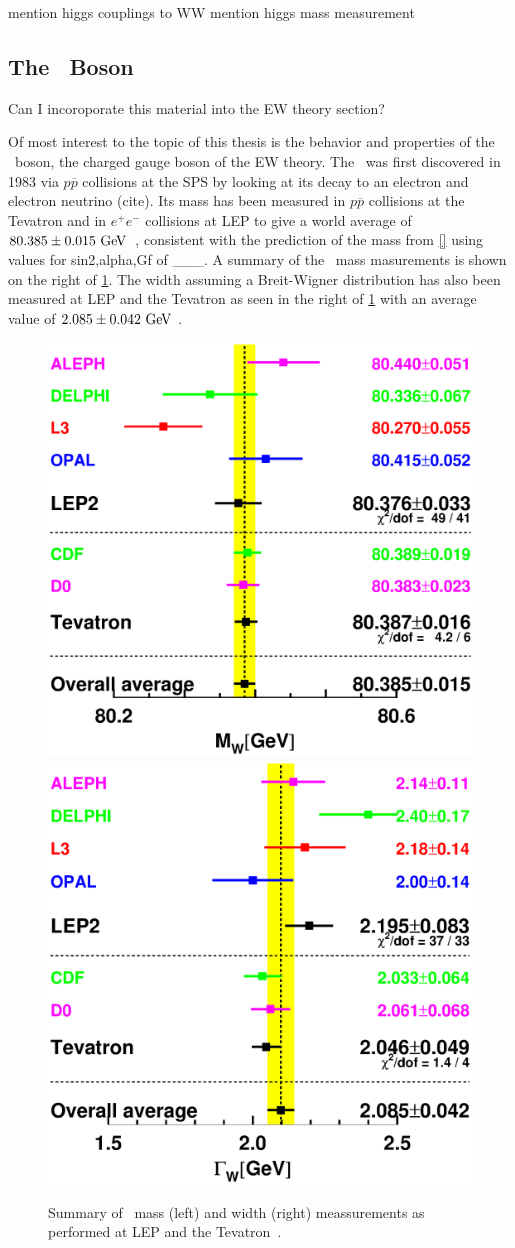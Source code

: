 mention higgs couplings to WW
mention higgs mass measurement



\subsection{The \dubya~Boson}

Can I incoroporate this material into the EW theory section?


Of most interest to the topic of this thesis is the behavior and properties
of the \dubya~boson, the charged gauge boson of the EW theory.
The \dubya~was first discovered in 1983 via $p\overline{p}$ collisions
at the SPS by looking at its decay to an electron %
and electron neutrino (cite).
Its mass has been measured in $p\overline{p}$ collisions at the Tevatron
and in $e^{+}e^{-}$ collisions at LEP to give a world 
average of $80.385 \pm 0.015\GeV$~\cite{PDG:2014}, consistent
with the prediction of the mass from \eqn\eqref{}
using values for sin2,alpha,Gf of \_\_\_.
A summary of the \dubya~mass masurements is shown on 
the right of \fig\ref{fig:theory_w_pdg}.
The width assuming a Breit-Wigner distribution has also been measured 
at LEP and the Tevatron as seen in the right of \fig\ref{fig:theory_w_pdg}
with an average value of $2.085\pm0.042\GeV$ \cite{PDG:2014}.

\begin{figure}[ht]
\centering
\includegraphics[width=.45\textwidth]{figures/theory/wmass_pdg.eps}
\includegraphics[width=.45\textwidth]{figures/theory/wwidth_pdg.eps}
\caption{Summary of \dubya~mass (left) and width (right) meassurements
as performed at LEP and the Tevatron~\cite{PDG:2014}.}
\label{fig:theory_w_pdg}
\end{figure}

